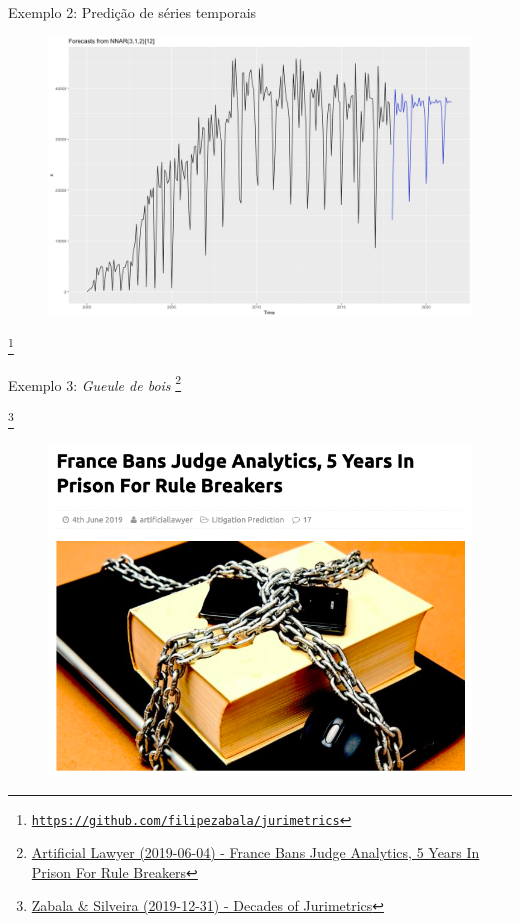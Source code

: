\documentclass{beamer}
\newcommand\blfootnote[1]{%
  \begingroup
  \renewcommand\thefootnote{}\footnote{#1}%
  \addtocounter{footnote}{-1}%
  \endgroup
}
\begin{document}
\begin{frame}{Exemplo 2: Predição de séries temporais}
\begin{figure}
\includegraphics[scale=0.23]{forecast}
\end{figure}
\blfootnote{\tiny{\href{https://github.com/filipezabala/jurimetrics}{\nolinkurl{https://github.com/filipezabala/jurimetrics}}}}
\end{frame}

\begin{frame}{Exemplo 3: \textit{Gueule de bois}}
\blfootnote{\tiny{\href{https://www.artificiallawyer.com/2019/06/04/france-bans-judge-analytics-5-years-in-prison-for-rule-breakers/}{Artificial Lawyer (2019-06-04) - France Bans Judge Analytics, 5 Years In Prison For Rule Breakers}}}
\blfootnote{\tiny{\href{https://arxiv.org/abs/2001.00476}{Zabala \& Silveira (2019-12-31) - Decades of Jurimetrics}}}
\begin{figure}
\includegraphics[scale=0.35]{franca}
\end{figure}
\end{frame}
\end{document}
